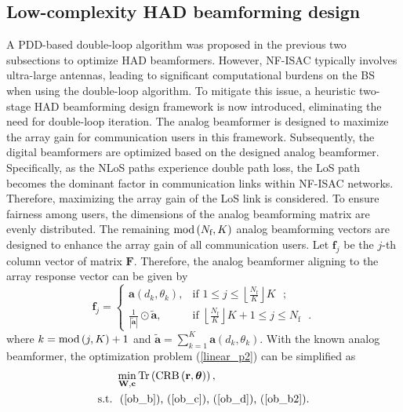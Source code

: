 \documentclass[10pt,journal,twocolumn]{IEEEtran}
\begin{document}
\subsection{Low-complexity HAD beamforming design}
A PDD-based double-loop algorithm was proposed in the previous two subsections to optimize HAD beamformers. However, NF-ISAC typically involves ultra-large antennas, leading to significant computational burdens on the BS when using the double-loop algorithm. To mitigate this issue, a heuristic two-stage HAD beamforming design framework is now introduced, eliminating the need for double-loop iteration. The analog beamformer is designed to maximize the array gain for communication users in this framework. Subsequently, the digital beamformers are optimized based on the designed analog beamformer. Specifically, as the NLoS paths experience double path loss, the LoS path becomes the dominant factor in communication links within NF-ISAC networks. Therefore, maximizing the array gain of the LoS link is considered. To ensure fairness among users, the dimensions of the analog beamforming matrix are evenly distributed. The remaining ${\rm{mod}}\left(N_{\text{f}}, K\right)$ analog beamforming vectors are designed to enhance the array gain of all communication users. Let $\mathbf{f}_j$ be the $j$-th column vector of matrix $\mathbf{F}$. Therefore, the analog beamformer aligning to the array response vector can be given by
\begin{equation}\label{fra}
\mathbf{f}_{j}=
\begin{cases}
\mathbf{a}\left(d_k,\theta_k\right),&\mbox{if $1\leq j\leq \left\lfloor \frac{N_{\text{f}}}{K}\right\rfloor K$ };\\
\frac{1}{|\tilde{\mathbf{a}}|}\odot \tilde{\mathbf{a}}, &\mbox{if $\left\lfloor \frac{N_{\text{f}}}{K}\right\rfloor K+1\leq j\leq N_{\text{f}}$ }.
\end{cases}
\end{equation}
where $k={\rm{mod}}\left(j,K\right)+1$ and $\tilde{\mathbf{a}}=\sum_{k=1}^{K}\mathbf{a}\left(d_k,\theta_k\right)$. With the known analog beamformer, the optimization problem (\ref{linear_p2}) can be simplified as
\begin{subequations}\label{linear_p9}
	\begin{align}
&\min_{\mathbf{W},\mathbf{c} } \text{Tr}\left(\text{CRB}\left(\mathbf{r},\bm{\theta}\right)\right),\label{ob_a9}\\
	\text{s.t.}~
 &\mbox{ (\ref{ob_b}),~(\ref{ob_c}),~(\ref{ob_d}),~(\ref{ob_b2})}.\label{ob_b9} 
	\end{align}
\end{subequations}
\end{document}
